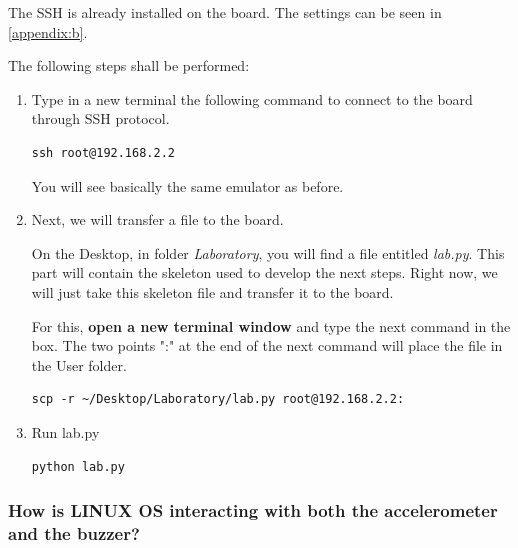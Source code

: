 The SSH is already installed on the board. The settings can be seen in \cref{appendix:b}.

The following steps shall be performed: 
\begin{enumerate}
    \item Type in a new terminal the following command to connect to the board through SSH protocol.
    \begin{tcolorbox}
        \begin{verbatim}
ssh root@192.168.2.2
        \end{verbatim}
    \end{tcolorbox}
    You will see basically the same emulator as before.

    \item Next, we will transfer a file to the board.

    On the Desktop, in folder \textit{Laboratory}, you will find a file entitled \textit{lab.py}. This part will contain the skeleton used to develop the next steps. Right now, we will just take this skeleton file and transfer it to the board.

    For this, \textbf{open a new terminal window} and type the next command in the box. The two points ":" at the end of the next command will place the file in the User folder.
    \begin{tcolorbox}
     \begin{verbatim}
scp -r ~/Desktop/Laboratory/lab.py root@192.168.2.2:
    \end{verbatim}
    \end{tcolorbox}

\item Run lab.py

    \begin{tcolorbox}
     \begin{verbatim}
python lab.py
    \end{verbatim}
    \end{tcolorbox}



\end{enumerate}













\subsubsection{How is LINUX OS interacting with both the accelerometer and the buzzer?}

